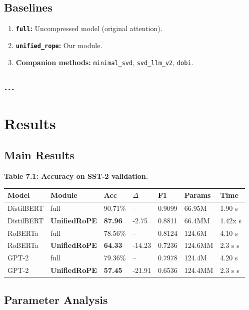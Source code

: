 {\subsection{Baselines}

\begin{enumerate}
\item \textbf{\texttt{full}:} Uncompressed model (original attention).
\item \textbf{\texttt{unified\_rope}:} Our module.
\item \textbf{Companion methods:} \texttt{minimal\_svd}, \texttt{svd\_llm\_v2}, \texttt{dobi}.
\end{enumerate}
\begin{lstlisting}

---
\end{lstlisting}


\section{Results}

\subsection{Main Results}

\textbf{Table 7.1: Accuracy on SST-2 validation.}

\begin{table}[H]
\centering
\small
\begin{tabular}{lllllll}
\toprule
\textbf{Model} & \textbf{Module} & \textbf{Acc} & \textbf{$\Delta$} & \textbf{F1} & \textbf{Params} & \textbf{Time} \\
\midrule
DistilBERT & full & 90.71\% & -- & 0.9099 & 66.95M & 1.90 s \\
DistilBERT & \textbf{UnifiedRoPE} & \textbf{87.96} & -2.75 & 0.8811 & 66.4MM & 1.42x s \\
RoBERTa & full & 78.56\% & -- & 0.8124 & 124.6M & 4.10 s \\
RoBERTa & \textbf{UnifiedRoPE} & \textbf{64.33} & -14.23 & 0.7236 & 124.6MM & 2.3 s s \\
GPT-2 & full & 79.36\% & -- & 0.7978 & 124.4M & 4.20 s \\
GPT-2 & \textbf{UnifiedRoPE} & \textbf{57.45} & -21.91 & 0.6536 & 124.4MM & 2.3 s s \\
\bottomrule
\end{tabular}
\end{table}

\subsection{Parameter Analysis}

}
